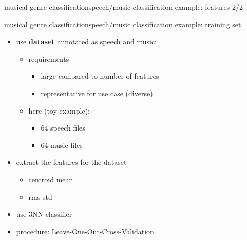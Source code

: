         \begin{frame}{musical genre classification}{speech/music classification example: features 2/2}
        \end{frame}

        \begin{frame}{musical genre classification}{speech/music classification example: training set}
            \begin{itemize}
                \item	use \textbf{dataset} annotated as speech and music:
                    \begin{itemize}
                        \item	requirements
                            \begin{itemize}
                                \item	large compared to number of features
                                \item	representative for use case (diverse)
                            \end{itemize}
                        \item	here (toy example):
                            \begin{itemize}
                                \item	64 speech files
                                \item	64 music files
                            \end{itemize}
                    \end{itemize}
                \bigskip
                \item	extract the features for the dataset
                    \begin{itemize}
                        \item   centroid mean
                        \item   rms std
                    \end{itemize}
                \bigskip
                \item	use 3NN classifier
                \bigskip
                \item	procedure: Leave-One-Out-Cross-Validation
            \end{itemize}
        \end{frame}


